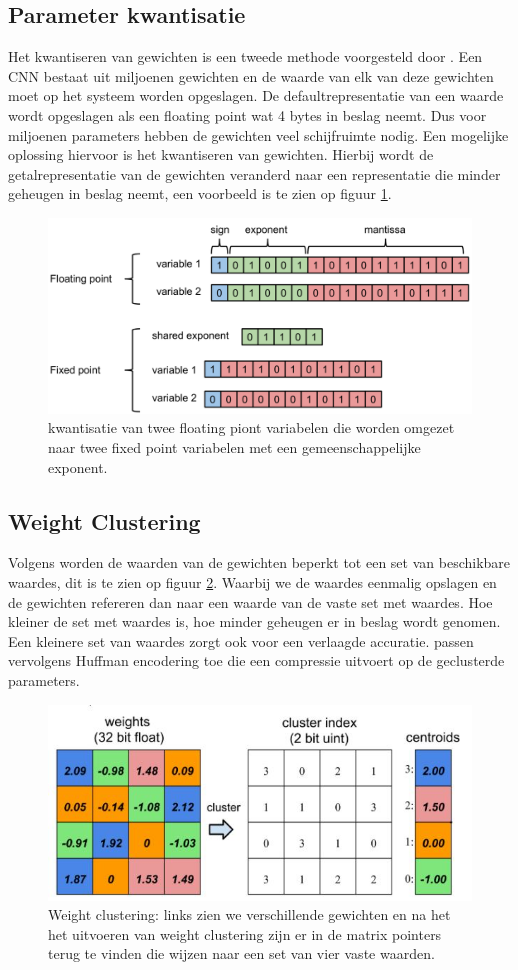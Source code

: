 \subsection{Parameter kwantisatie} \label{quant}
Het kwantiseren van gewichten is een tweede methode voorgesteld door \cite{han_deep_2016}.
Een CNN bestaat uit miljoenen gewichten en de waarde van elk van deze gewichten moet op het systeem worden opgeslagen.
De defaultrepresentatie van een waarde wordt opgeslagen als een floating point wat 4 bytes in beslag neemt.
Dus voor miljoenen parameters hebben de gewichten veel schijfruimte nodig.
Een mogelijke oplossing hiervoor is het kwantiseren van gewichten.
Hierbij wordt de getalrepresentatie van de gewichten veranderd naar een representatie die minder geheugen in beslag neemt, een voorbeeld is te zien op figuur \ref{fig:kwantizatie}.

\begin{figure}[!ht]
	\centering
	\includegraphics[width=0.7\linewidth]{fig/kwantization.png}
	\caption{kwantisatie van twee floating piont variabelen die worden omgezet naar twee fixed point variabelen met een gemeenschappelijke exponent.}
	\label{fig:kwantizatie}
\end{figure}

\subsection{Weight Clustering}
Volgens \cite{han_deep_2016} worden de waarden van de gewichten beperkt tot een set van beschikbare waardes, dit is te zien op figuur \ref{fig:clus}.
Waarbij we de waardes eenmalig opslagen en de gewichten refereren dan naar een waarde van de vaste set met waardes.
Hoe kleiner de set met waardes is, hoe minder geheugen er in beslag wordt genomen.
Een kleinere set van waardes zorgt ook voor een verlaagde accuratie.
\cite{han_deep_2016} passen vervolgens Huffman encodering toe die een compressie uitvoert op de geclusterde parameters.

\begin{figure}[!ht]
	\centering
	\includegraphics[width=0.7\linewidth]{fig/clus.jpg}
	\caption{Weight clustering: links zien we verschillende gewichten en na het het uitvoeren van weight clustering zijn er in de matrix pointers terug te vinden die wijzen naar een set van vier vaste waarden.}
	\label{fig:clus}
\end{figure}


